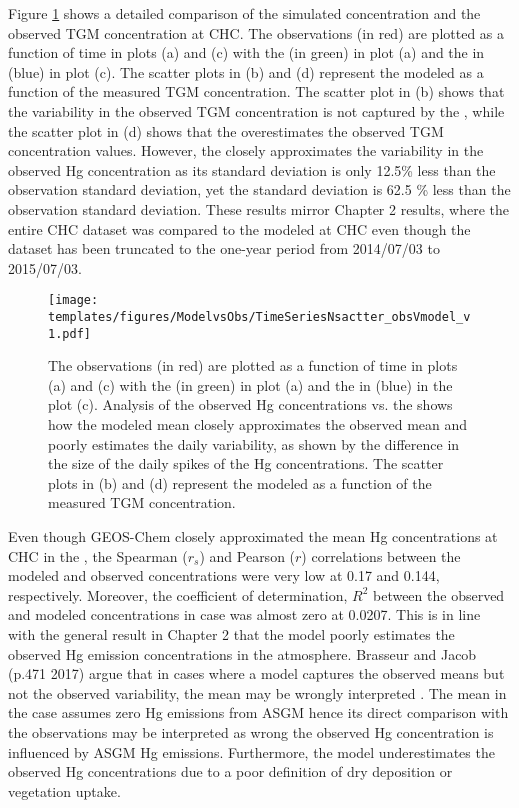 \FloatBarrier
\begin{flushleft}
   Figure \ref{fig:ModelvsObsNstats} shows a detailed comparison of the simulated \hg concentration and the observed TGM concentration at CHC. The observations (in red) are plotted as a function of time in plots (a) and (c) with the \off (in green) in plot (a)  and the \on in (blue) in plot (c). The scatter plots in (b) and (d) represent the modeled \hg  as a function of the measured TGM concentration. The scatter plot in (b) shows that the variability in the observed TGM concentration is not captured by the \off, while the scatter plot in (d) shows that the \on overestimates the observed TGM concentration values. However, the \on closely approximates the variability in the observed Hg concentration as its standard deviation is only 12.5\% less than the observation standard deviation, yet the \off standard deviation is 62.5 \% less than the observation standard deviation. These results mirror Chapter 2 results, where the entire CHC dataset was compared to the modeled \hgc at CHC even though the dataset has been truncated to the one-year period from 2014/07/03 to 2015/07/03. 
\end{flushleft}
\begin{figure}[H]
  \texttt{[image: templates/figures/ModelvsObs/TimeSeriesNsactter\_obsVmodel\_v1.pdf]}
  \centering
  \caption{The observations (in red) are plotted as a function of time in plots (a) and (c) with the \off (in green) in plot (a) and the \on in (blue) in the plot (c). Analysis of the observed Hg concentrations vs. the \off  shows how the modeled mean closely approximates the observed mean and poorly estimates the daily variability, as shown by the difference in the size of the daily spikes of the Hg concentrations. The scatter plots in (b) and (d) represent the modeled \hg  as a function of the measured TGM concentration.}
  \label{fig:ModelvsObsNstats}
\end{figure}
\FloatBarrier

\begin{flushleft}
    Even though GEOS-Chem closely approximated the mean Hg concentrations at CHC in the \off, the Spearman ($r_s$) and Pearson ($r$) correlations between the modeled and observed concentrations were very low at 0.17 and 0.144, respectively. Moreover, the coefficient of determination, $R^2$ between the observed and modeled concentrations in \off case was almost zero at 0.0207. This is in line with the general result in Chapter 2 that the model poorly estimates the observed Hg emission concentrations in the atmosphere. Brasseur and Jacob (p.471 2017) argue that in cases where a model captures the observed means but not the observed variability, the mean may be wrongly interpreted \cite{brasseur_modeling_2017}. The mean in the \off case assumes zero Hg emissions from ASGM hence its direct comparison with the observations may be interpreted as wrong the observed Hg concentration is influenced by ASGM Hg emissions. Furthermore, the model underestimates the observed Hg concentrations due to a poor definition of dry deposition or vegetation uptake.  
\end{flushleft}

